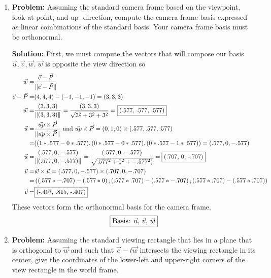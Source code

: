\documentclass[a4paper, 12pt]{article}
\newcommand{\norm}[1]{\lVert#1\rVert}
\begin{document}

\begin{enumerate}
    \item \textbf{Problem:} Assuming the standard camera frame based on the viewpoint, look-at point, and up- direction, compute the camera frame basis expressed as linear combinations of the standard basis.  Your camera frame basis must be orthonormal.

        \textbf{Solution:} First, we must compute the vectors that will compose our basis \(\vec{u}, \vec{v}, \vec{w}\).
        \(\vec{w}\) is opposite the view direction so
        \begin{align*}
        \vec{w} =& \frac{\vec{e} - \vec{P}}{\norm{\vec{e} - \vec{P}}}\\
        \vec{e} - \vec{P} =& (4,4,4) - (-1,-1,-1) = (3,3,3)\\
        \vec{w} =& \frac{(3,3,3)}{\norm{(3,3,3)}} = \frac{(3,3,3)}{\sqrt{3^2 + 3^2 + 3^2}} = \fbox{(.577, .577, .577)}\\
        \vec{u} =& \frac{\vec{up} \times \vec{P}}{\norm{\vec{up} \times \vec{P}}} \text{ and } \vec{up} \times \vec{P} = (0,1,0) \times (.577, .577, .577)\\
        =& ( (1*.577 - 0*.577), (0*.577 - 0*.577), (0*.577 - 1*.577))  = (.577, 0, -.577)\\
        \vec{u} =& \frac{(.577, 0, -.577)}{\norm{(.577, 0, -.577)}} = \frac{(.577, 0, -.577)}{\sqrt{.577^2 + 0^2 + -.577^2)}} = \fbox{(.707, 0, -.707)}\\
        \vec{v} =& \vec{w} \times \vec{u} = (.577, 0, -.577) \times (.707, 0, -.707)\\
        =& \left( \left( .577*-.707 \right) - \left( .577*0 \right), \left( .577*.707 \right) - \left( .577*-.707 \right), \left( .577*.707 \right) - \left( .577*.707 \right) \right)\\
        \vec{v} =& \fbox{(-.407, .815, -.407)}\\
        \end{align*}
        These vectors form the orthonormal basis for the camera frame.
        \[\fbox{Basis: $\vec{u}$, $\vec{v}$, $\vec{w}$}\]

    \item \textbf{Problem:} Assuming the standard viewing rectangle that lies in a plane that is orthogonal to \(\vec{w}\) and such that \(\vec{e} - t\vec{w}\) intersects the viewing rectangle in its center, give the coordinates of the lower-left and upper-right corners of the view rectangle in the world frame.


\end{enumerate}
\end{document}
